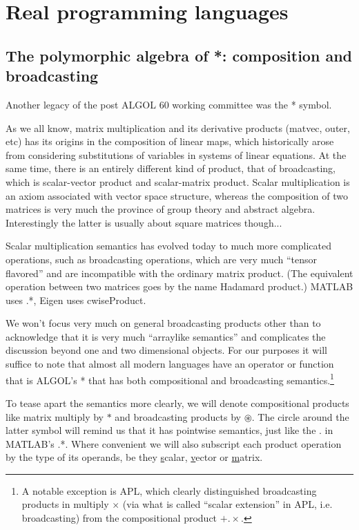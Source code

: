 \label{sec:reallanguages}
\section{Real programming languages}

\subsection{The polymorphic algebra of {*}: composition and broadcasting}

Another legacy of the post ALGOL 60 working committee was the {*}
symbol.\cite{Hockney1961}

As we all know, matrix multiplication and its derivative products
(matvec, outer, etc) has its origins in the composition of linear
maps, which historically arose from considering substitutions of variables
in systems of linear equations. At the same time, there is an entirely
different kind of product, that of broadcasting, which is scalar-vector
product and scalar-matrix product. Scalar multiplication is an axiom
associated with vector space structure, whereas the composition of
two matrices is very much the province of group theory and abstract
algebra. Interestingly the latter is usually about square matrices
though...

Scalar multiplication semantics has evolved today to much more complicated
operations, such as broadcasting operations, which are very much ``tensor
flavored'' and are incompatible with the ordinary matrix product.
(The equivalent operation between two matrices goes by the name Hadamard
product.) MATLAB uses .{*}, Eigen uses cwiseProduct.

We won't focus very much on general broadcasting products other than
to acknowledge that it is very much ``arraylike semantics'' and
complicates the discussion beyond one and two dimensional objects.
For our purposes it will suffice to note that almost all modern languages
have an operator or function that is ALGOL's {*} that has both compositional
and broadcasting semantics.\footnote{A notable exception is APL, which clearly distinguished broadcasting
products in multiply $\times$ (via what is called ``scalar extension''
in APL, i.e. broadcasting) from the compositional product $+.\times$.}

To tease apart the semantics more clearly, we will denote compositional
products like matrix multiply by $*$ and broadcasting products by
$\circledast$. The circle around the latter symbol will remind us
that it has pointwise semantics, just like the . in MATLAB's .{*}.
Where convenient we will also subscript each product operation by
the type of its operands, be they \uline{s}calar, \uline{v}ector
or \uline{m}atrix.


